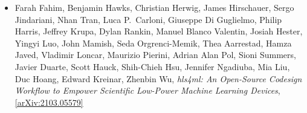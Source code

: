 \begin{itemize}
\item Farah Fahim, Benjamin Hawks, Christian Herwig, James Hirschauer, Sergo Jindariani, Nhan Tran, Luca P.\  Carloni, Giuseppe Di Guglielmo, Philip Harris, Jeffrey Krupa, Dylan Rankin, Manuel Blanco Valentin, Josiah Hester, Yingyi Luo, John Mamish, Seda Orgrenci-Memik, Thea Aarrestad, Hamza Javed, Vladimir Loncar, Maurizio Pierini, Adrian Alan Pol, Sioni Summers, Javier Duarte, Scott Hauck, Shih-Chieh Hsu, Jennifer Ngadiuba, Mia Liu, Duc Hoang, Edward Kreinar, Zhenbin Wu, \textit{hls4ml: An Open-Source Codesign Workflow to Empower Scientific Low-Power Machine Learning Devices}, \href{https://arxiv.org/abs/2103.05579}{[arXiv:2103.05579]} 
\end{itemize}